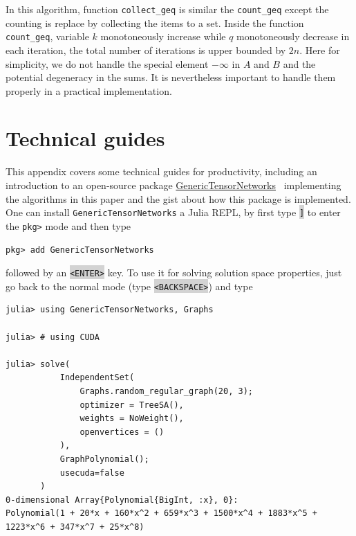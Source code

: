 \documentclass[onefignum, onetabnum]{siamart190516}
\newcommand{\<}{\langle}
\renewcommand{\>}{\rangle}
\begin{document}
In this algorithm, function \texttt{collect\_geq} is similar the \texttt{count\_geq} except the counting is replace by collecting the items to a set.
Inside the function \texttt{count\_geq}, variable $k$ monotoneously increase while $q$ monotoneously decrease in each iteration,
the total number of iterations is upper bounded by $2n$.
Here for simplicity, we do not handle the special element $-\infty$ in $A$ and $B$ and the potential degeneracy in the sums.
It is nevertheless important to handle them properly in a practical implementation.

\section{Technical guides}\label{sec:technical}

This appendix covers some technical guides for productivity, including an introduction to an open-source package \href{https://github.com/QuEraComputing/GenericTensorNetworks.jl}{GenericTensorNetworks}~\cite{GenericTensorNetworks} implementing the algorithms in this paper and the gist about how this package is implemented.
One can install \texttt{GenericTensorNetworks} a Julia REPL, by first type \colorbox{lightgray}{\texttt{]}} to enter the \texttt{pkg>} mode and then type
\begin{lstlisting}
pkg> add GenericTensorNetworks
\end{lstlisting}
followed by an \colorbox{lightgray}{\texttt{<ENTER>}} key.
To use it for solving solution space properties, just go back to the normal mode (type \colorbox{lightgray}{\texttt{<BACKSPACE>}}) and type

\begin{lstlisting}
julia> using GenericTensorNetworks, Graphs

julia> # using CUDA

julia> solve(
           IndependentSet(
               Graphs.random_regular_graph(20, 3);
               optimizer = TreeSA(),
               weights = NoWeight(),
               openvertices = ()
           ),
           GraphPolynomial();
           usecuda=false
       )
0-dimensional Array{Polynomial{BigInt, :x}, 0}:
Polynomial(1 + 20*x + 160*x^2 + 659*x^3 + 1500*x^4 + 1883*x^5 + 1223*x^6 + 347*x^7 + 25*x^8)
\end{lstlisting}
\end{document}
